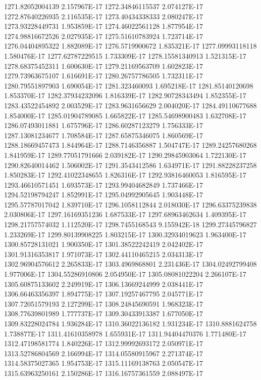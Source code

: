 1271.82052004139  2.157967E-17
1272.34846115537  2.074127E-17
1272.87640226935  2.116535E-17
1273.40434338333  2.080247E-17
1273.93228449731  1.953859E-17
1274.46022561128  1.877954E-17
1274.98816672526  2.027935E-17
1275.51610783924  1.723714E-17
1276.04404895322  1.882089E-17
1276.5719900672  1.835321E-17
1277.09993118118  1.580476E-17
1277.62787229515  1.733309E-17
1278.15581340913  1.521315E-17
1278.68375452311  1.600630E-17
1279.21169563709  1.602823E-17
1279.73963675107  1.616691E-17
1280.26757786505  1.732311E-17
1280.79551897903  1.690054E-17
1281.323460093  1.695218E-17
1281.85140120698  1.853370E-17
1282.37934232096  1.816339E-17
1282.90728343494  1.852355E-17
1283.43522454892  2.003529E-17
1283.9631656629  2.004020E-17
1284.49110677688  1.854000E-17
1285.01904789085  1.665822E-17
1285.54698900483  1.632708E-17
1286.07493011881  1.675796E-17
1286.60287123279  1.756333E-17
1287.13081234677  1.708584E-17
1287.65875346075  1.860569E-17
1288.18669457473  1.844964E-17
1288.7146356887  1.504747E-17
1289.24257680268  1.841959E-17
1289.77051791666  2.039182E-17
1290.29845903064  1.722130E-17
1290.82640014462  1.506002E-17
1291.3543412586  1.634971E-17
1291.88228237258  1.850283E-17
1292.41022348655  1.826316E-17
1292.93816460053  1.816595E-17
1293.46610571451  1.693573E-17
1293.99404682849  1.737466E-17
1294.52198794247  1.852991E-17
1295.04992905645  1.903448E-17
1295.57787017042  1.839710E-17
1296.1058112844  2.018030E-17
1296.63375239838  2.030806E-17
1297.16169351236  1.687533E-17
1297.68963462634  1.409395E-17
1298.21757574032  1.112520E-17
1298.7455168543  9.155942E-18
1299.27345796827  1.233269E-17
1299.80139908225  1.803215E-17
1300.32934019623  1.963400E-17
1300.85728131021  1.900350E-17
1301.38522242419  2.042402E-17
1301.91316353817  1.971073E-17
1302.44110465215  2.034313E-17
1302.96904576612  2.265833E-17
1303.4969868801  2.231436E-17
1304.02492799408  1.977006E-17
1304.55286910806  2.054950E-17
1305.08081022204  2.266107E-17
1305.60875133602  2.249919E-17
1306.13669244999  2.038441E-17
1306.66463356397  1.894775E-17
1307.19257467795  2.045771E-17
1307.72051579193  2.127299E-17
1308.24845690591  1.968323E-17
1308.77639801989  1.777737E-17
1309.30433913387  1.677050E-17
1309.83228024784  1.936284E-17
1310.36022136182  1.931234E-17
1310.8881624758  1.738877E-17
1311.41610358978  1.655931E-17
1311.94404470376  1.771480E-17
1312.47198581774  1.840226E-17
1312.99992693172  2.050971E-17
1313.52786804569  2.166994E-17
1314.05580915967  2.271374E-17
1314.58375027365  1.954753E-17
1315.11169138763  2.050547E-17
1315.63963250161  2.150286E-17
1316.16757361559  2.088497E-17
